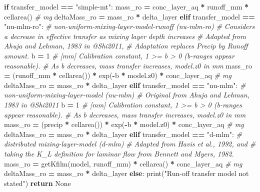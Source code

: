\documentclass[]{article}
\newenvironment{Shaded}{\begin{snugshade}}{\end{snugshade}}
\newcommand{\DecValTok}[1]{\textcolor[rgb]{0.00,0.00,0.81}{{#1}}}
\newcommand{\StringTok}[1]{\textcolor[rgb]{0.31,0.60,0.02}{{#1}}}
\newcommand{\CommentTok}[1]{\textcolor[rgb]{0.56,0.35,0.01}{\textit{{#1}}}}
\newcommand{\VariableTok}[1]{\textcolor[rgb]{0.00,0.00,0.00}{{#1}}}
\newcommand{\ControlFlowTok}[1]{\textcolor[rgb]{0.13,0.29,0.53}{\textbf{{#1}}}}
\newcommand{\OperatorTok}[1]{\textcolor[rgb]{0.81,0.36,0.00}{\textbf{{#1}}}}
\newcommand{\BuiltInTok}[1]{{#1}}
\newcommand{\NormalTok}[1]{{#1}}
\begin{document}
\begin{Shaded}
\begin{Highlighting}[]
    \ControlFlowTok{if} \NormalTok{transfer_model }\OperatorTok{==} \StringTok{"simple-mt"}\NormalTok{:}
        \NormalTok{mass_ro }\OperatorTok{=} \NormalTok{conc_layer_aq }\OperatorTok{*} \NormalTok{runoff_mm }\OperatorTok{*} \NormalTok{cellarea()  }\CommentTok{# mg}
        \NormalTok{deltaMass_ro }\OperatorTok{=} \NormalTok{mass_ro }\OperatorTok{*} \NormalTok{delta_layer}
    \ControlFlowTok{elif} \NormalTok{transfer_model }\OperatorTok{==} \StringTok{"nu-mlm-ro"}\NormalTok{:}
        \CommentTok{# non-uniform-mixing-layer-model-runoff (nu-mlm-ro)}
        \CommentTok{# Considers a decrease in effective transfer as mixing layer depth increases}
        \CommentTok{# Adapted from Ahuja and Lehman, 1983 in @Shi2011,}
        \CommentTok{# Adaptation replaces Precip by Runoff amount.}
        \NormalTok{b }\OperatorTok{=} \DecValTok{1}  \CommentTok{# [mm] Calibration constant, 1 >= b > 0 (b-ranges appear reasonable).}
        \CommentTok{# As b decreases, mass transfer increases, model.z0 in mm}
        \NormalTok{mass_ro }\OperatorTok{=} \NormalTok{(runoff_mm }\OperatorTok{*} \NormalTok{cellarea()) }\OperatorTok{*} \NormalTok{exp(}\OperatorTok{-}\NormalTok{b }\OperatorTok{*} \NormalTok{model.z0) }\OperatorTok{*} \NormalTok{conc_layer_aq  }\CommentTok{# mg}
        \NormalTok{deltaMass_ro }\OperatorTok{=} \NormalTok{mass_ro }\OperatorTok{*} \NormalTok{delta_layer}
    \ControlFlowTok{elif} \NormalTok{transfer_model }\OperatorTok{==} \StringTok{"nu-mlm"}\NormalTok{:}
        \CommentTok{# non-uniform-mixing-layer-model (nu-mlm)}
        \CommentTok{# Original from Ahuja and Lehman, 1983 in @Shi2011}
        \NormalTok{b }\OperatorTok{=} \DecValTok{1}  \CommentTok{# [mm] Calibration constant, 1 >= b > 0 (b-ranges appear reasonable).}
        \CommentTok{# As b decreases, mass transfer increases, model.z0 in mm}
        \NormalTok{mass_ro }\OperatorTok{=} \NormalTok{(precip }\OperatorTok{*} \NormalTok{cellarea()) }\OperatorTok{*} \NormalTok{exp(}\OperatorTok{-}\NormalTok{b }\OperatorTok{*} \NormalTok{model.z0) }\OperatorTok{*} \NormalTok{conc_layer_aq  }\CommentTok{# mg}
        \NormalTok{deltaMass_ro }\OperatorTok{=} \NormalTok{mass_ro }\OperatorTok{*} \NormalTok{delta_layer}
    \ControlFlowTok{elif} \NormalTok{transfer_model }\OperatorTok{==} \StringTok{"d-mlm"}\NormalTok{:}
        \CommentTok{# distributed mixing-layer-model (d-mlm)}
        \CommentTok{# Adapted from Havis et al., 1992, and}
        \CommentTok{# taking the K_L definition for laminar flow from Bennett and Myers, 1982.}
        \NormalTok{mass_ro }\OperatorTok{=} \NormalTok{getKfilm(model, runoff_mm) }\OperatorTok{*} \NormalTok{cellarea() }\OperatorTok{*} \NormalTok{conc_layer_aq  }\CommentTok{# mg}
        \NormalTok{deltaMass_ro }\OperatorTok{=} \NormalTok{mass_ro }\OperatorTok{*} \NormalTok{delta_layer}
    \ControlFlowTok{else}\NormalTok{:}
        \BuiltInTok{print}\NormalTok{(}\StringTok{"Run-off transfer model not stated"}\NormalTok{)}
        \ControlFlowTok{return} \VariableTok{None}
        

\end{Highlighting}
\end{Shaded}
\end{document}
